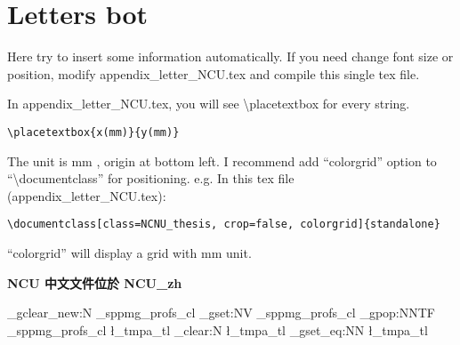 \documentclass[class=NCNU_thesis, crop=false]{standalone}
\begin{document}
\chapter{Letters bot}

Here try to insert some information automatically.
If you need change font size or position, modify appendix\_letter\_NCU.tex and compile this single tex file.

In appendix\_letter\_NCU.tex, you will see \textbackslash{}placetextbox for every string.
\begin{lstlisting}[style=LatexStyle,caption={}]
\placetextbox{x(mm)}{y(mm)}
\end{lstlisting}

The unit is mm , origin at bottom left. I recommend add ``colorgrid'' option to ``\textbackslash{}documentclass'' for positioning. e.g. In this tex file (appendix\_letter\_NCU.tex):

\begin{lstlisting}[style=LatexStyle,caption={}]
\documentclass[class=NCNU_thesis, crop=false, colorgrid]{standalone}
\end{lstlisting}

``colorgrid'' will display a grid with mm unit. 

\begin{center}
{ \noindent\color{red}\bfseries\Large NCU 中文文件位於 NCU\_zh}
\end{center}

\ExplSyntaxOn
    \clist_gclear_new:N \g_sppmg_profs_cl
    \clist_gset:NV \g_sppmg_profs_cl \profs
    \clist_gpop:NNTF \g_sppmg_profs_cl \l_tmpa_tl {}{ \tl_clear:N \l_tmpa_tl}
    \cs_gset_eq:NN \mprof \l_tmpa_tl
\ExplSyntaxOff

\def\title{\titleEn}

\cleardoublepage
\pagestyle{empty}
\sffamily


\end{document}
